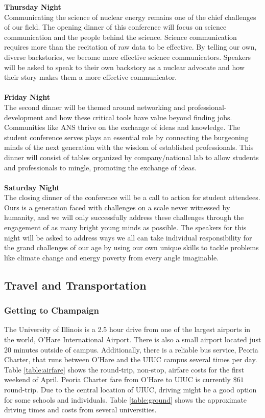 \textbf{Thursday Night}\\
Communicating the science of nuclear energy remains one of the chief challenges of our field. The opening dinner of this conference will focus on science communication and the people behind the science. Science communication requires more than the recitation of raw data to be effective. By telling our own, diverse backstories, we become more effective science communicators. Speakers will be asked to speak to their own backstory as a nuclear advocate and how their story makes them a more effective communicator.\\\\
\indent\textbf{Friday Night}\\
The second dinner will be themed around networking and professional-development and how these critical tools have value beyond finding jobs. Communities like ANS thrive on the exchange of ideas and knowledge. The student conference serves plays an essential role by connecting the burgeoning minds of the next generation with the wisdom of established professionals. This dinner will consist of tables organized by company/national lab to allow students and professionals to mingle, promoting the exchange of ideas.\\\\ 
\indent\textbf{Saturday Night}\\
The closing dinner of the conference will be a call to action for student attendees. Ours is a generation faced with challenges on a scale never witnessed by humanity, and we will only successfully address these challenges through the engagement of as many bright young minds as possible. The speakers for this night will be asked to address ways we all can take individual responsibility for the grand challenges of our age by using our own unique skills to tackle problems like climate change and energy poverty from every angle imaginable.\\ 
\subsection{Travel and Transportation}

\subsubsection{Getting to Champaign}
The University of Illinois is a 2.5 hour drive from one of the largest airports in the world, O'Hare International Airport. There is also a small airport located just 20 minutes outside of campus. Additionally, there is a reliable bus service, Peoria Charter, that runs between O'Hare and the UIUC campus several times per day. Table \ref{table:airfare} shows the round-trip, non-stop, airfare costs for the first weekend of April. Peoria Charter fare from O'Hare to UIUC is currently $\$61$ round-trip. Due to the central location of UIUC, driving might be a good option for some schools and individuals. Table \ref{table:ground} shows the approximate driving times and costs from several universities. 

